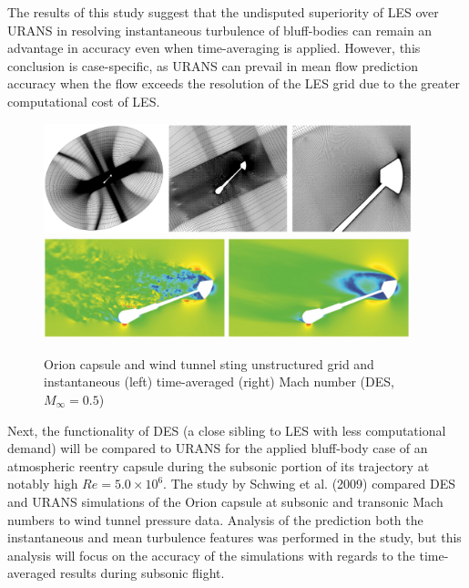 \documentclass[journal]{new-aiaa}
\begin{document}
The results of this study suggest that the undisputed superiority of LES over URANS in resolving instantaneous turbulence of bluff-bodies can remain an advantage in accuracy even when time-averaging is applied. However, this conclusion is case-specific, as URANS can prevail in mean flow prediction accuracy when the flow exceeds the resolution of the LES grid due to the greater computational cost of LES.




















\begin{figure}[H]
\begin{center}
\includegraphics[width=0.95\textwidth]{Images/logan/schwing2015detachededdy_grid.pdf}
\includegraphics[width=0.95\textwidth]{Images/logan/schwing2015detachededdy_flow.pdf}
\caption{ Orion capsule and wind tunnel sting unstructured grid and instantaneous (left) time-averaged (right) Mach number (DES, $M_{\infty
}=0.5$) \cite{schwing2015detachededdy} }
\label{fig:oriongridflow}
\end{center}
\end{figure}

Next, the functionality of DES (a close sibling to LES with less computational demand) will be compared to URANS for the applied bluff-body case of an atmospheric reentry capsule during the subsonic portion of its trajectory at notably high $Re=5.0 \times 10^6$.  The study by Schwing et al. (2009) \cite{schwing2015detachededdy} compared DES and URANS simulations of the Orion capsule at subsonic and transonic Mach numbers to wind tunnel pressure data. Analysis of the prediction both the instantaneous and mean turbulence features was performed in the study, but this analysis will focus on the accuracy of the simulations with regards to the time-averaged results during subsonic flight.
\end{document}
